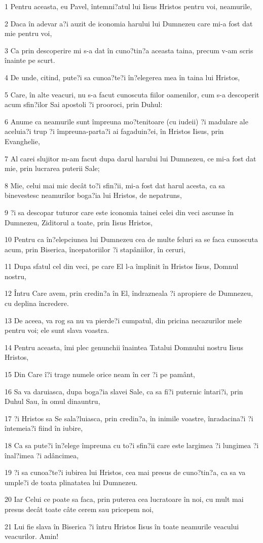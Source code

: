 \par 1 Pentru aceasta, eu Pavel, întemni?atul lui Iisus Hristos pentru voi, neamurile,
\par 2 Daca în adevar a?i auzit de iconomia harului lui Dumnezeu care mi-a fost dat mie pentru voi,
\par 3 Ca prin descoperire mi s-a dat în cuno?tin?a aceasta taina, precum v-am scris înainte pe scurt.
\par 4 De unde, citind, pute?i sa cunoa?te?i în?elegerea mea în taina lui Hristos,
\par 5 Care, în alte veacuri, nu s-a facut cunoscuta fiilor oamenilor, cum s-a descoperit acum sfin?ilor Sai apostoli ?i prooroci, prin Duhul:
\par 6 Anume ca neamurile sunt împreuna mo?tenitoare (cu iudeii) ?i madulare ale aceluia?i trup ?i împreuna-parta?i ai fagaduin?ei, în Hristos Iisus, prin Evanghelie,
\par 7 Al carei slujitor m-am facut dupa darul harului lui Dumnezeu, ce mi-a fost dat mie, prin lucrarea puterii Sale;
\par 8 Mie, celui mai mic decât to?i sfin?ii, mi-a fost dat harul acesta, ca sa binevestesc neamurilor boga?ia lui Hristos, de nepatruns,
\par 9 ?i sa descopar tuturor care este iconomia tainei celei din veci ascunse în Dumnezeu, Ziditorul a toate, prin Iisus Hristos,
\par 10 Pentru ca în?elepciunea lui Dumnezeu cea de multe feluri sa se faca cunoscuta acum, prin Biserica, începatoriilor ?i stapâniilor, în ceruri,
\par 11 Dupa sfatul cel din veci, pe care El l-a împlinit în Hristos Iisus, Domnul nostru,
\par 12 Întru Care avem, prin credin?a în El, îndrazneala ?i apropiere de Dumnezeu, cu deplina încredere.
\par 13 De aceea, va rog sa nu va pierde?i cumpatul, din pricina necazurilor mele pentru voi; ele sunt slava voastra.
\par 14 Pentru aceasta, îmi plec genunchii înaintea Tatalui Domnului nostru Iisus Hristos,
\par 15 Din Care î?i trage numele orice neam în cer ?i pe pamânt,
\par 16 Sa va daruiasca, dupa boga?ia slavei Sale, ca sa fi?i puternic întari?i, prin Duhul Sau, în omul dinauntru,
\par 17 ?i Hristos sa Se sala?luiasca, prin credin?a, în inimile voastre, înradacina?i ?i întemeia?i fiind în iubire,
\par 18 Ca sa pute?i în?elege împreuna cu to?i sfin?ii care este largimea ?i lungimea ?i înal?imea ?i adâncimea,
\par 19 ?i sa cunoa?te?i iubirea lui Hristos, cea mai presus de cuno?tin?a, ca sa va umple?i de toata plinatatea lui Dumnezeu.
\par 20 Iar Celui ce poate sa faca, prin puterea cea lucratoare în noi, cu mult mai presus decât toate câte cerem sau pricepem noi,
\par 21 Lui fie slava în Biserica ?i întru Hristos Iisus în toate neamurile veacului veacurilor. Amin!

